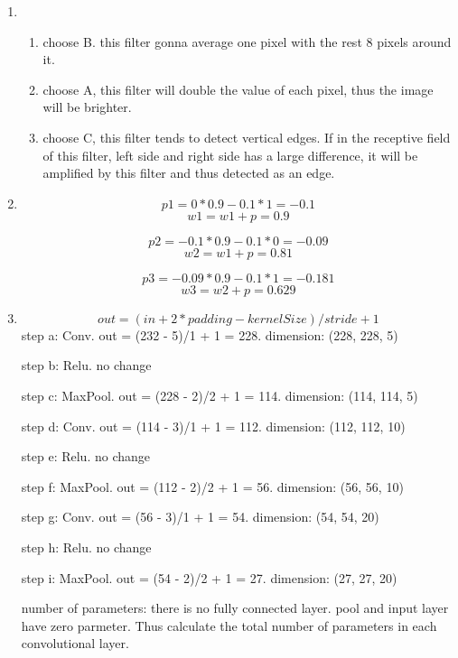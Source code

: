 \documentclass[12pt]{article}
\begin{document}
\begin{enumerate}
\item
\begin{enumerate}
\item choose B. this filter gonna average one pixel with the rest 8 pixels around it.
\item choose A, this filter will double the value of each pixel, thus the image will be brighter.
\item choose C, this filter tends to detect vertical edges. If in the receptive field of this filter, left side and right side has a large difference, it will be amplified by this filter and thus detected as an edge. 
\end{enumerate}

\item  
    $$ p1 = 0 * 0.9 - 0.1 * 1 = -0.1 $$
    $$ w1 = w1 + p = 0.9 $$

    $$ p2 = -0.1 * 0.9 - 0.1 * 0 = -0.09 $$
    $$ w2 = w1 + p = 0.81 $$

    $$ p3 = -0.09 * 0.9 - 0.1 * 1 = -0.181 $$
    $$ w3 = w2 + p  = 0.629$$ 


\item
   $$ out = (in + 2 * padding - kernelSize)/stride + 1 $$
   step a: Conv. out = (232 - 5)/1 + 1 = 228. dimension: (228, 228, 5) 
   
   step b: Relu. no change
   
   step c: MaxPool. out = (228 - 2)/2 + 1 = 114. dimension: (114, 114, 5)
  
   step d: Conv. out = (114 - 3)/1 + 1 = 112. dimension: (112, 112, 10)

   step e: Relu. no change

   step f: MaxPool. out = (112 - 2)/2 + 1 = 56. dimension: (56, 56, 10)

    step g: Conv. out = (56 - 3)/1 + 1 = 54. dimension: (54, 54, 20)

    step h: Relu. no change

    step i: MaxPool. out = (54 - 2)/2 + 1 = 27. dimension: (27, 27, 20)

    number of parameters: there is no fully connected layer. pool and input layer have zero parmeter. Thus calculate the total number of parameters in each convolutional layer.


\end{enumerate}
\end{document}
